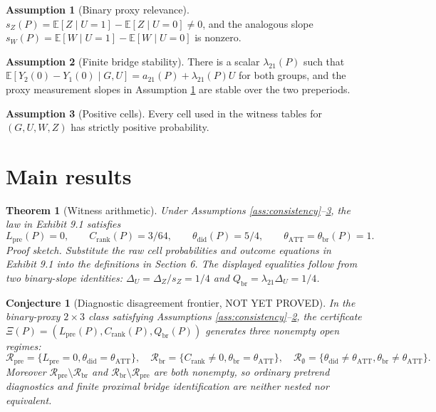 \documentclass[11pt]{article}
\newcommand{\E}{\mathbb{E}}
\theoremstyle{definition}
\newtheorem{assumption}{Assumption}
\theoremstyle{plain}
\newtheorem{theorem}{Theorem}
\newtheorem{conjecture}{Conjecture}
\theoremstyle{remark}
\begin{document}
\begin{assumption}[Binary proxy relevance]\label{ass:proxy-relevance}
$s_Z(P)=\E[Z\mid U=1]-\E[Z\mid U=0]\ne0$, and the analogous slope
$s_W(P)=\E[W\mid U=1]-\E[W\mid U=0]$ is nonzero.
\end{assumption}

\begin{assumption}[Finite bridge stability]\label{ass:bridge-stability}
There is a scalar $\lambda_{21}(P)$ such that
$\E[Y_2(0)-Y_1(0)\mid G,U]=a_{21}(P)+\lambda_{21}(P)U$ for both groups, and
the proxy measurement slopes in Assumption \ref{ass:proxy-relevance} are stable
over the two preperiods.
\end{assumption}

\begin{assumption}[Positive cells]\label{ass:positive-cells}
Every cell used in the witness tables for $(G,U,W,Z)$ has strictly positive
probability.
\end{assumption}

\section{Main results}
\begin{theorem}[Witness arithmetic]\label{thm:witness-arithmetic}
Under Assumptions \ref{ass:consistency}--\ref{ass:positive-cells}, the law in
Exhibit 9.1 satisfies
\[
L_{\mathrm{pre}}(P)=0,\qquad C_{\mathrm{rank}}(P)=3/64,\qquad
\theta_{\mathrm{did}}(P)=5/4,\qquad
\theta_{\mathrm{ATT}}=\theta_{\mathrm{br}}(P)=1 .
\]
Proof sketch. Substitute the raw cell probabilities and outcome equations in
Exhibit 9.1 into the definitions in Section 6. The displayed equalities follow
from two binary-slope identities:
$\Delta_U=\Delta_Z/s_Z=1/4$ and
$Q_{\mathrm{br}}=\lambda_{21}\Delta_U=1/4$.
\end{theorem}

\begin{conjecture}[Diagnostic disagreement frontier, NOT YET PROVED]\label{conj:diagnostic-frontier}
In the binary-proxy $2\times3$ class satisfying Assumptions
\ref{ass:consistency}--\ref{ass:bridge-stability}, the certificate
$\Xi(P)=(L_{\mathrm{pre}}(P),C_{\mathrm{rank}}(P),Q_{\mathrm{br}}(P))$
generates three nonempty open regimes:
\[
\mathcal R_{\mathrm{pre}}=\{L_{\mathrm{pre}}=0,\theta_{\mathrm{did}}=\theta_{\mathrm{ATT}}\},
\quad
\mathcal R_{\mathrm{br}}=\{C_{\mathrm{rank}}\ne0,\theta_{\mathrm{br}}=\theta_{\mathrm{ATT}}\},
\quad
\mathcal R_{\emptyset}=\{\theta_{\mathrm{did}}\ne\theta_{\mathrm{ATT}},\theta_{\mathrm{br}}\ne\theta_{\mathrm{ATT}}\}.
\]
Moreover $\mathcal R_{\mathrm{pre}}\setminus\mathcal R_{\mathrm{br}}$ and
$\mathcal R_{\mathrm{br}}\setminus\mathcal R_{\mathrm{pre}}$ are both nonempty,
so ordinary pretrend diagnostics and finite proximal bridge identification are
neither nested nor equivalent.
\end{conjecture}
\end{document}
